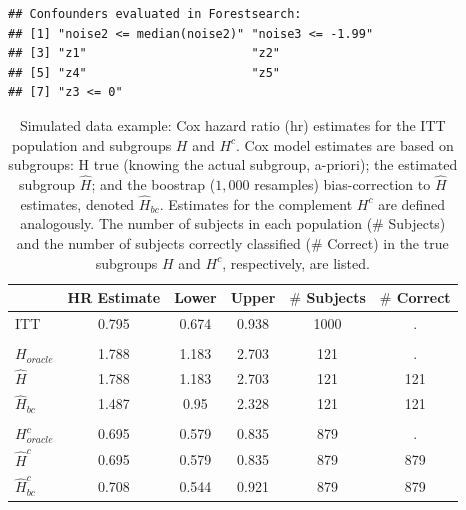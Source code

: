 \documentclass[smallextended]{svjour3}
\makeatletter
\newenvironment{kframe}{%
 \def\at@end@of@kframe{}%
 \ifinner\ifhmode%
  \def\at@end@of@kframe{\end{minipage}}%
  \begin{minipage}{\columnwidth}%
 \fi\fi%
 \def\FrameCommand##1{\hskip\@totalleftmargin \hskip-\fboxsep
 \colorbox{shadecolor}{##1}\hskip-\fboxsep
     \hskip-\linewidth \hskip-\@totalleftmargin \hskip\columnwidth}%
 \MakeFramed {\advance\hsize-\width
   \@totalleftmargin\z@ \linewidth\hsize
   \@setminipage}}%
 {\par\unskip\endMakeFramed%
 \at@end@of@kframe}
\newenvironment{knitrout}{}{} %
\makeatother
\begin{document}
\begin{knitrout}
\color{fgcolor}\begin{kframe}
\begin{verbatim}
## Confounders evaluated in Forestsearch:
## [1] "noise2 <= median(noise2)" "noise3 <= -1.99"         
## [3] "z1"                       "z2"                      
## [5] "z4"                       "z5"                      
## [7] "z3 <= 0"
\end{verbatim}
\end{kframe}
\end{knitrout}





\begin{table}

\caption{\label{tab:simex_tab}\label{tab:simex} Simulated data example: Cox hazard ratio (hr) estimates for the ITT population and subgroups $H$ and $H^{c}$.
Cox model estimates are based on subgroups: H true (knowing the actual subgroup, a-priori); the estimated subgroup $\hat{H}$; and 
the boostrap ($1,000$ resamples) bias-correction to $\hat{H}$ estimates, denoted $\hat{H}_{bc}$.  Estimates for the complement $H^{c}$ are defined analogously.
The number of subjects in each population ($\#$ Subjects) and the number of subjects correctly classified ($\#$ Correct) in the true subgroups $H$ and $H^{c}$, respectively, are listed.}
\centering
\fontsize{9}{11}\selectfont
\begin{tabular}[t]{lccccc}
\toprule
  & HR Estimate & Lower & Upper & $\#$ Subjects & $\#$ Correct\\
\midrule
ITT & 0.795 & 0.674 & 0.938 & 1000 & .\\
\addlinespace[0.3em]
\multicolumn{6}{l}{\textbf{H subgroup estimates}}\\
\hspace{1em}$H_{oracle}$ & 1.788 & 1.183 & 2.703 & 121 & .\\
\hspace{1em}$\hat{H}$ & 1.788 & 1.183 & 2.703 & 121 & 121\\
\hspace{1em}$\hat{H}_{bc}$ & 1.487 & 0.95 & 2.328 & 121 & 121\\
\addlinespace[0.3em]
\multicolumn{6}{l}{\textbf{H-complement subgroup estimates}}\\
\hspace{1em}$H^{c}_{oracle}$ & 0.695 & 0.579 & 0.835 & 879 & .\\
\hspace{1em}$\hat{H}^{c}$ & 0.695 & 0.579 & 0.835 & 879 & 879\\
\hspace{1em}$\hat{H}^{c}_{bc}$ & 0.708 & 0.544 & 0.921 & 879 & 879\\
\bottomrule
\end{tabular}
\end{table}





\end{document}
